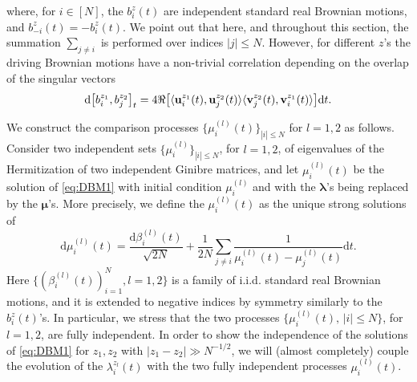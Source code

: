 \documentclass[10pt]{amsart}
\numberwithin{equation}{section}
\newcommand{\dif}{\mathrm{d}}
\begin{document}
where, for $i\in [N]$, the $b_i^z(t)$ are independent standard real Brownian motions, and $b_{-i}^z(t)=-b_i^z(t)$. We point out that here, and throughout this section, the summation $\sum_{j\ne i}$ is performed over indices $|j|\le N$. However, for different $z$'s the driving Brownian motions have a non-trivial correlation depending on the overlap of the singular vectors
\begin{equation}
\label{eq:corrbms11}
\dif \big[b_i^{z_1},  b_j^{z_2}\big]_t=4\Re\big[\langle {\bf u}_i^{z_1}(t),{\bf u}_j^{z_2}(t)\rangle\langle {\bf v}_j^{z_2}(t), {\bf v}_i^{z_1}(t)\rangle \big]\dif t.
\end{equation}

We construct the comparison processes $\{\mu_i^{(l)}(t)\}_{|i|\le N}$ for $l=1,2$ as follows. Consider two independent sets $\{\mu_i^{(l)}\}_{|i|\le N}$, for $l=1,2$, of eigenvalues of the Hermitization of two independent Ginibre matrices, and let $\mu_i^{(l)}(t)$ be the solution of \eqref{eq:DBM1} with initial condition $\mu_i^{(l)}$ and with the ${\bm \lambda}$'s being replaced by the ${\bm \mu}$'s.  More precisely, we define the $\mu_i^{(l)}(t)$ as the unique strong solutions of
\begin{equation}
\label{eq:coupleDBM1}
\dif \mu_i^{(l)}(t)=\frac{\dif \beta_i^{(l)}(t)}{\sqrt{2N}}+\frac{1}{2N}\sum_{j\ne i}\frac{1}{\mu_i^{(l)}(t)-\mu_j^{(l)}(t)}\dif t.
\end{equation}
Here $\{(\beta_i^{(l)}(t))_{i=1}^N, l=1,2\}$ is a family of i.i.d. standard real Brownian motions, and it is extended to negative indices by symmetry similarly to the $b_i^z(t)$'s. In particular, we stress that the two processes $\{\mu_i^{(l)}(t),\, |i|\le N\}$, for $l=1,2$, are fully independent. In order to show the independence of the solutions of \eqref{eq:DBM1} for $z_1,z_2$ with $|z_1-z_2|\gg N^{-1/2}$, we will (almost completely) couple the evolution of the $\lambda_i^{z_l}(t)$ with the two fully independent processes $\mu_i^{(l)}(t)$.
\end{document}
